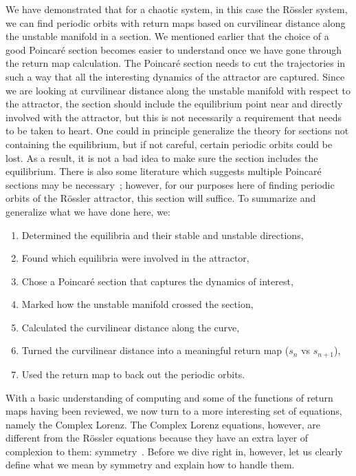 \documentclass[12 pt]{article}
\begin{document}
We have demonstrated that for a chaotic system, in this case the
R\"ossler system, we can find periodic orbits with return maps based on
curvilinear distance along the unstable manifold in a section. We
mentioned earlier that the choice of a good Poincar\'e section becomes
easier to understand once we have gone through the return map
calculation.  The Poincar\'e section needs to cut the trajectories in
such a way that all the interesting dynamics of the attractor are
captured.  Since we are looking at curvilinear distance along the
unstable manifold with respect to the attractor, the section should
include the equilibrium point near and directly involved with the
attractor, but this is not necessarily a requirement that needs to be
taken to heart.  One could in principle generalize the theory for
sections not containing the equilibrium, but if not careful, certain
periodic orbits could be lost.  As a result, it is not a bad idea to make
sure the section includes the equilibrium.  There is also some literature
which suggests multiple Poincar\'e sections may be necessary~\cite{Atl};
however, for our purposes here of finding periodic orbits of the
R\"ossler attractor, this section will suffice.
To summarize and generalize what we have done here, we:
\begin{enumerate}
    \item Determined the equilibria and their stable and unstable directions,
    \item Found which equilibria were involved in the attractor,
    \item Chose a Poincar\'e section that captures the dynamics of interest,
    \item Marked how the unstable manifold crossed the section,
    \item Calculated the curvilinear distance along the curve,
    \item Turned the curvilinear distance into a meaningful return map
          ($s_{n}$ vs $s_{n+1}$),
    \item Used the return map to back out the periodic orbits.
\end{enumerate}

With a basic understanding of computing and some of the functions of
return maps having been reviewed, we now turn to a more interesting set
of equations, namely the Complex Lorenz.  The Complex Lorenz equations,
however, are different from the R\"ossler equations because they have an
extra layer of complexion to them: symmetry~\cite{Eth}.  Before we dive
right in, however, let us clearly define what we mean by symmetry and
explain how to handle them.
\end{document}
